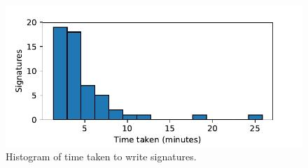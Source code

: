 \begin{figure}[h]
	\includegraphics[scale=0.5]{results/signature_times_small.pdf}
	\caption{Histogram of time taken to write signatures.}
	\label{fig:signature_times}
\end{figure}


